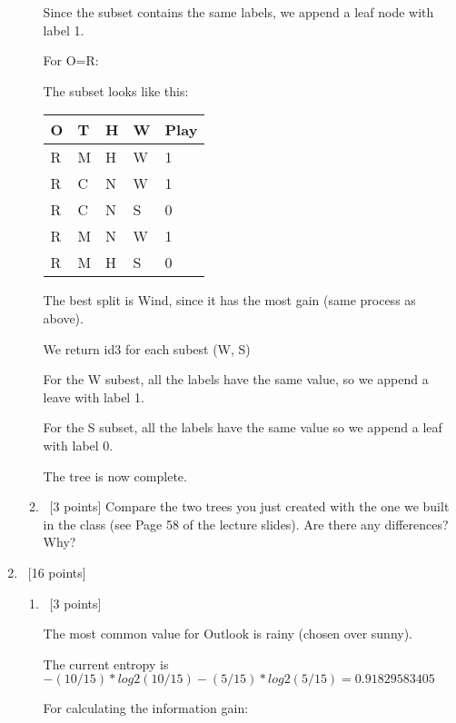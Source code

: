 \documentclass[12pt, fullpage,letterpaper]{article}
\begin{document}
\begin{enumerate}
\begin{enumerate}
Since the subset contains the same labels, we append a leaf node with label 1.

For O=R:

The subset looks like this:

\begin{tabular}{|l|l|l|l|l|}
	\hline
	O & T & H & W & Play \\ \hline
	R & M & H & W & 1    \\ \hline
	R & C & N & W & 1    \\ \hline
	R & C & N & S & 0    \\ \hline
	R & M & N & W & 1    \\ \hline
	R & M & H & S & 0    \\ \hline
	\end{tabular}


The best split is Wind, since it has the most gain (same process as above).

We return id3 for each subest (W, S)

For the W subest, all the labels have the same value, so we append a leave with label 1.

For the S subset, all the labels have the same value so we append a leaf with label 0.

The tree is now complete.

	\item~[3 points] Compare the two trees you just created with the one we built in the class (see Page 58 of the lecture slides). Are there any differences? Why? 
\end{enumerate}

\item~[16 points] 
\begin{enumerate}
\item~[3 points] 

The most common value for Outlook is rainy (chosen over sunny). 

The current entropy is $-(10/15)*log2(10/15)-(5/15)*log2(5/15)= 0.91829583405$

For calculating the information gain:


\end{enumerate}
\end{enumerate}
\end{document}
